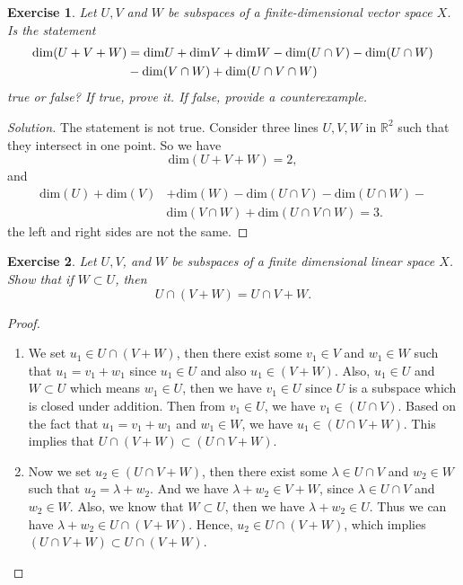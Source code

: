 \documentclass[10pt]{book}
\newtheorem{exercise}{Exercise}[section]
\theoremstyle{definition}
\numberwithin{equation}{chapter}
\begin{document}
\begin{exercise}\label{ex_2}
Let $U, V$ and $W$ be subspaces of a finite-dimensional vector space $X$. Is the statement
\begin{align*}
    {\rm dim}(U + V + W) & = {\rm dim} U + {\rm dim} V + {\rm dim} W - {\rm dim}(U \cap V) - {\rm dim}(U \cap W) \\
    & - {\rm dim}(V \cap W) + {\rm dim}(U \cap V \cap W)
\end{align*}
true or false? If true, prove it. If false, provide a counterexample.
\end{exercise}
\begin{proof}[Solution]
The statement is not true. Consider three lines $U,V,W$ in $\mathbb{R}^2$ such that they intersect in one point. So we have
$$\text{dim} (U+V+W) = 2,$$
and
\begin{align*}
   \text{dim}(U) + \text{dim}(V) & + \text{dim}(W) - \text{dim}(U \cap V) - \text{dim}(U \cap W) - \\
   & \text{dim}(V \cap W) + \text{dim}(U \cap V \cap W) = 3.
\end{align*}
the left and right sides are not the same. 
\end{proof}

\medskip

\begin{exercise}\label{ex_3}
Let $U, V$, and $W$ be subspaces of a finite dimensional linear space $X$. Show that if $W\subset U$, then 
$$U\cap (V + W) = U\cap V + W.$$
\end{exercise}
\begin{proof}
~\begin{enumerate}[label=(\alph*)]
    \item We set $u_1 \in U \cap (V+W)$, then there exist some $v_1 \in V$ and $w_1 \in W$ such that $u_1 = v_1 + w_1$ since $u_1 \in U$ and also $u_1 \in (V+W)$. Also, $u_1 \in U$ and $W \subset U$ which means $w_1 \in U$, then we have $v_1 \in U$ since $U$ is a subspace which is closed under addition. Then from $v_1 \in U$, we have $v_1 \in (U \cap V)$. Based on the fact that $u_1 = v_1 + w_1$ and $w_1 \in W$, we have $u_1 \in (U \cap V + W)$. This implies that $U \cap (V+W) \subset (U \cap V + W)$.
    \item Now we set $u_2 \in (U \cap V + W)$, then there exist some $\lambda \in U \cap V$ and $w_2 \in W$ such that $u_2 = \lambda + w_2$. And we have $\lambda + w_2 \in V+W$, since $\lambda \in U \cap V$ and $w_2 \in W$. Also, we know that $W \subset U$, then we have $\lambda + w_2 \in U$. Thus we can have $\lambda + w_2 \in U \cap (V+W)$. Hence, $u_2 \in U \cap (V+W)$, which implies $(U \cap V + W) \subset U \cap (V+W)$.
\end{enumerate}
\end{proof}
\end{document}
